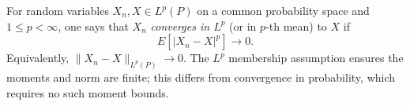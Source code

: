 
For random variables $X_n,X\in L^p(P)$ on a common probability space and $1\le p<\infty$, one says that $X_n$ \emph{converges in $L^p$} (or in $p$-th mean) to $X$ if
\[
E[|X_n-X|^p]\longrightarrow0.
\]
Equivalently, $\|X_n-X\|_{L^p(P)}\to0$. The $L^p$ membership assumption ensures the moments and norm are finite; this differs from convergence in probability, which requires no such moment bounds.
